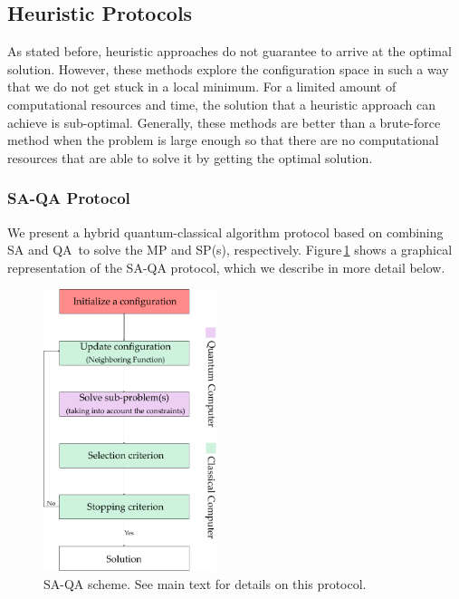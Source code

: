 \subsection{Heuristic Protocols}
As stated before, heuristic approaches do not guarantee to arrive at the optimal solution. However, these methods explore the configuration space in such a way that we do not get stuck in a local minimum. For a limited amount of computational resources and time, the solution that a heuristic approach can achieve is sub-optimal. Generally, these methods are better than a brute-force method when the problem is large enough so that there are no computational resources that are able to solve it by getting the optimal solution.
\subsubsection{SA-QA Protocol}
We present a hybrid quantum-classical algorithm protocol based on combining SA and QA\,\cite{Ding2019ImplementationDesign} to solve the MP and SP(s), respectively. Figure\,\ref{fig:SA_QAProtocol} shows a graphical representation of the SA-QA protocol, which we describe in more detail below. 
\begin{figure}[H]
\centering
\includegraphics[width=0.45\textwidth]{Figures/SAQAProtocol.pdf} 
\caption{SA-QA scheme. See main text for details on this protocol.}
\label{fig:SA_QAProtocol}
\end{figure}
